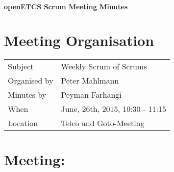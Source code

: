 \documentclass[a4paper, 11pt]{article}
\begin{document}
{\begin{center}\huge\bf openETCS Scrum Meeting Minutes\end{center}}
\section{Meeting Organisation}

\renewcommand{\arraystretch}{1.5}
\begin{supertabular}{m{.2\textwidth}m{.8\textwidth}}
Subject & Weekly Scrum of Scrums\\
Organised by &Peter Mahlmann\\
Minutes by & Peyman Farhangi\\
When & June, 26th, 2015, 10:30 - 11:15\\
Location & Telco and Goto-Meeting\\
\end{supertabular}

\renewcommand{\arraystretch}{1.0}
\section{Meeting:}
\end{document}
